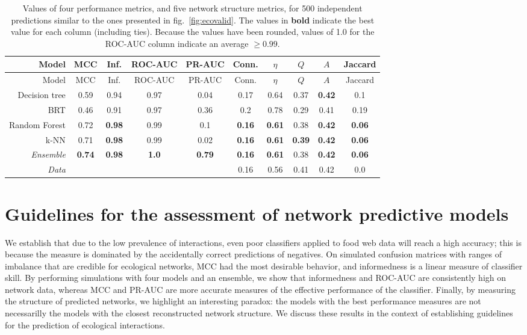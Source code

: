 \documentclass[11pt]{article}
\begin{document}
\hypertarget{tbl:comparison}{}
\begin{longtable}[]{@{}rccccccccc@{}}
\caption{\label{tbl:comparison}Values of four performance metrics, and
five network structure metrics, for 500 independent predictions similar
to the ones presented in fig.~\ref{fig:ecovalid}. The values in
\textbf{bold} indicate the best value for each column (including ties).
Because the values have been rounded, values of 1.0 for the ROC-AUC
column indicate an average \(\ge 0.99\).}\tabularnewline
\toprule
Model & MCC & Inf. & ROC-AUC & PR-AUC & Conn. & \(\eta\) & \(Q\) & \(A\)
& Jaccard\tabularnewline
\midrule
\endfirsthead
\toprule
Model & MCC & Inf. & ROC-AUC & PR-AUC & Conn. & \(\eta\) & \(Q\) & \(A\)
& Jaccard\tabularnewline
\midrule
\endhead
Decision tree & 0.59 & 0.94 & 0.97 & 0.04 & 0.17 & 0.64 & 0.37 &
\textbf{0.42} & 0.1\tabularnewline
BRT & 0.46 & 0.91 & 0.97 & 0.36 & 0.2 & 0.78 & 0.29 & 0.41 &
0.19\tabularnewline
Random Forest & 0.72 & \textbf{0.98} & 0.99 & 0.1 & \textbf{0.16} &
\textbf{0.61} & 0.38 & \textbf{0.42} & \textbf{0.06}\tabularnewline
k-NN & 0.71 & \textbf{0.98} & 0.99 & 0.02 & \textbf{0.16} &
\textbf{0.61} & \textbf{0.39} & \textbf{0.42} &
\textbf{0.06}\tabularnewline
\emph{Ensemble} & \textbf{0.74} & \textbf{0.98} & \textbf{1.0} &
\textbf{0.79} & \textbf{0.16} & \textbf{0.61} & 0.38 & \textbf{0.42} &
\textbf{0.06}\tabularnewline
\emph{Data} & & & & & 0.16 & 0.56 & 0.41 & 0.42 & 0.0\tabularnewline
\bottomrule
\end{longtable}

\hypertarget{guidelines-for-the-assessment-of-network-predictive-models}{%
\section{Guidelines for the assessment of network predictive
models}\label{guidelines-for-the-assessment-of-network-predictive-models}}

We establish that due to the low prevalence of interactions, even poor
classifiers applied to food web data will reach a high accuracy; this is
because the measure is dominated by the accidentally correct predictions
of negatives. On simulated confusion matrices with ranges of imbalance
that are credible for ecological networks, MCC had the most desirable
behavior, and informedness is a linear measure of classifier skill. By
performing simulations with four models and an ensemble, we show that
informedness and ROC-AUC are consistently high on network data, whereas
MCC and PR-AUC are more accurate measures of the effective performance
of the classifier. Finally, by measuring the structure of predicted
networks, we highlight an interesting paradox: the models with the best
performance measures are not necessarilly the models with the closest
reconstructed network structure. We discuss these results in the context
of establishing guidelines for the prediction of ecological
interactions.
\end{document}
